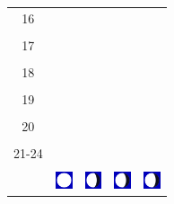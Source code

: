 \documentclass[a4paper,12pt, tikz]{scrartcl}
\begin{document}
\begin{tabularx}{\linewidth}{|c|X|X|p{2cm}|p{2cm}|}
            &   &       &    &   \\
          \hline
          16&   &                 &    &   \\
            &   &       &    &   \\
          \hline
          17&   &                 &    &   \\
            &   &       &    &   \\
          \hline
          18&   &                 &    &   \\
            &   &       &    &   \\
          \hline
          19&   &                 &     &   \\
            &   &       &    &   \\
          \hline
          20&   &              &    &   \\
            &   &       &    &   \\
          \hline 
          21-24&   &              &    &   \\
            &   &       &    &   \\
          \hline
                      & \vspace{0.01cm} \centerline{\includegraphics[width=0.5cm]{moon_phases/Moon_phase_4.svg.png}} \vspace{0.1cm} & \vspace{0.01cm} \centerline{\includegraphics[width=0.5cm]{moon_phases/Moon_phase_5.svg.png}} \vspace{0.1cm} & \vspace{0.01cm} \centerline{\includegraphics[width=0.5cm]{moon_phases/Moon_phase_5.svg.png}} \vspace{0.1cm} & \vspace{0.01cm} \centerline{\includegraphics[width=0.5cm]{moon_phases/Moon_phase_5.svg.png}} \vspace{0.1cm}\\
          \hline    
        \end{tabularx}
\end{document}

